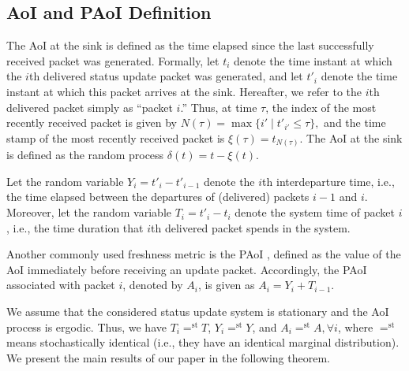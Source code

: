 \documentclass[conference]{IEEEtran}
\def\blue{\textcolor{blue}}
\newcommand{\RY}[1]{{\color{red} RY: #1}}
\begin{document}
\subsection{AoI and PAoI Definition}
The AoI at the sink is defined as the time elapsed since the last successfully received packet was generated. Formally, let $t_{i}$ denote the time instant at which the $i$th delivered status update packet was generated, and let $t'_{i}$ denote the time instant at which this packet arrives at the sink. 
Hereafter, we refer to the $i$th delivered packet simply as ``packet $i$.''
Thus, at time $\tau$, the index of the most recently received packet is given by
$N(\tau)=\max\{i'\mid t'_{i'}\le \tau\},$
and the time stamp of the most recently received packet is $\xi(\tau)=t_{N(\tau)}.$
The AoI at the sink is defined as the random process
${\delta(t)=t-\xi(t).}$


Let the random variable
$Y_{i}=t'_{i}-t'_{i-1}$
denote the $i$th interdeparture time, i.e., the time elapsed between the departures of (delivered) packets  $i-1$ and $i$.  
Moreover, let the random variable
$T_{i}=t'_{i}-t_{i}$
denote the system time of packet $i$, i.e., the time duration that $i$th delivered packet spends in the system. 

 Another commonly used freshness metric is the PAoI \cite{6875100}, defined as the value of the AoI immediately before receiving an update packet. Accordingly, the PAoI associated with packet $i$, denoted by $A_{i}$, 
is given as
%
$A_{i}= Y_{i}+T_{i-1}.$
%


We assume that the considered status update system is stationary and the AoI process
is ergodic. Thus, we have $T_{i}=^{\mathrm{st}}T$,  $Y_{i}=^{\mathrm{st}}Y$, and $A_{i}=^{\mathrm{st}}A,\forall i$, where ${=^{\mathrm{st}}}$ means stochastically identical (i.e., they have an identical marginal distribution).
We present the main results of our paper in the following theorem.
 
\end{document}
